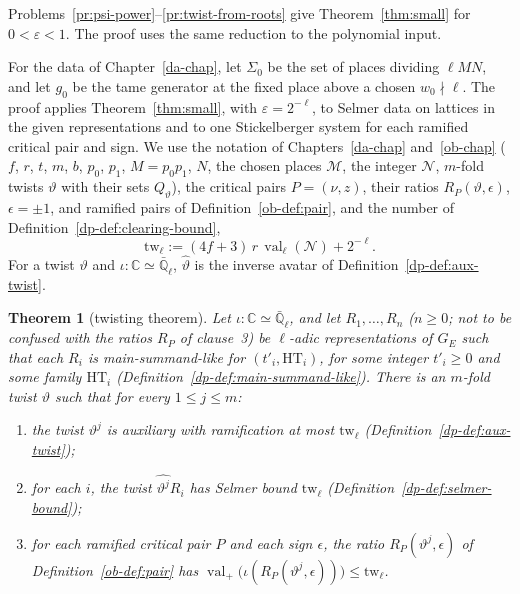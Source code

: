 \documentclass[reqno]{amsart}
\newcounter{chap}
\theoremstyle{definition}
\theoremstyle{plain}
\newtheorem{theorem}{Theorem}[section]
\newcommand{\C}{\mathbb{C}}
\newcommand{\Ql}{\bar{\mathbb{Q}}_\ell}
\newcommand{\val}{\operatorname{val}}
\begin{document}
Problems~\ref{pr:psi-power}--\ref{pr:twist-from-roots} give Theorem~\ref{thm:small} for \(0 < \varepsilon < 1\).  The proof uses the same reduction to the polynomial input.

For the data of Chapter~\ref{da-chap}, let \(\Sigma_0\) be the set of places dividing \(\ell MN\), and let \(g_0\) be the tame generator at the fixed place above a chosen \(w_0 \nmid \ell\).  The proof applies Theorem~\ref{thm:small}, with \(\varepsilon = 2^{-\ell}\), to Selmer data on lattices in the given representations and to one Stickelberger system for each ramified critical pair and sign.  We use the notation of Chapters~\ref{da-chap} and~\ref{ob-chap} (\(f\), \(r\), \(t\), \(m\), \(b\), \(p_0\), \(p_1\), \(M = p_0p_1\), \(N\), the chosen places \(\mathcal M\), the integer \(\mathcal N\), \(m\)-fold twists \(\vartheta\) with their sets \(Q_\vartheta\)), the critical pairs \(P = (\nu, z)\), their ratios \(R_P(\vartheta, \epsilon)\), \(\epsilon = \pm1\), and ramified pairs of Definition~\ref{ob-def:pair}, and the number of Definition~\ref{dp-def:clearing-bound},
\[
  \mathrm{tw}_\ell := (4f + 3)\, r\, \val_\ell(\mathcal N) + 2^{-\ell}.
\]
For a twist \(\vartheta\) and \(\iota\colon \C \simeq \Ql\), \(\hat\vartheta\) is the inverse avatar of Definition~\ref{dp-def:aux-twist}.

\begin{theorem}[twisting theorem]\label{thm:twisting}
Let \(\iota\colon \C \simeq \Ql\), and let \(R_1, \dots, R_n\) (\(n \ge 0\); not to be confused with the ratios \(R_P\) of clause~3) be \(\ell\)-adic representations of \(G_E\) such that each \(R_i\) is main-summand-like for \((t'_i, \mathrm{HT}_i)\), for some integer \(t'_i \ge 0\) and some family \(\mathrm{HT}_i\) (Definition~\ref{dp-def:main-summand-like}).  There is an \(m\)-fold twist \(\vartheta\) such that for every \(1 \le j \le m\):
\begin{enumerate}
\item the twist \(\vartheta^j\) is auxiliary with ramification at most \(\mathrm{tw}_\ell\) (Definition~\ref{dp-def:aux-twist});
\item for each \(i\), the twist \(\widehat{\vartheta^j}R_i\) has Selmer bound \(\mathrm{tw}_\ell\) (Definition~\ref{dp-def:selmer-bound});
\item for each ramified critical pair \(P\) and each sign \(\epsilon\), the ratio \(R_P(\vartheta^j, \epsilon)\) of Definition~\ref{ob-def:pair} has \(\val_+\bigl(\iota(R_P(\vartheta^j, \epsilon))\bigr) \le \mathrm{tw}_\ell\).
\end{enumerate}
\end{theorem}
\end{document}
